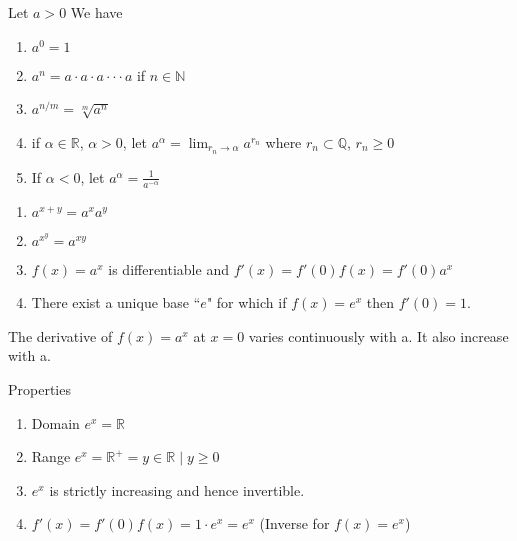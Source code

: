 

\begin{defn}[$a^x$]
Let $a > 0 $ We have
\begin{enumerate}
    \item $a^0 = 1$
    \item $a^n = a\cdot a\cdot a \cdot \cdot\cdot a$ if $n \in \mathbb{N}$
    \item $\displaystyle a^{n/m} = \sqrt[m]{a^{n}}$
    \item if $\alpha \in \mathbb{R}$, $\alpha > 0$, let $a^\alpha = \lim_{r_n\to \alpha}a^{r_n}$ where ${r_n}\subset \mathbb{Q}$, $r_n\geq 0$
    \item If $\alpha <0$, let $a^\alpha = \frac{1}{a^{-\alpha}}$
\end{enumerate}

\end{defn}

\begin{thm}[Properties of $a^x$]\leavevmode

\begin{enumerate}
    \item $a^{x+y} = a^xa^y$
    \item $a^{x^y} = a^{xy}$
    \item $f(x) =a^x$ is differentiable and $f'(x) = f'(0)f(x) = f'(0)a^x$
    \item There exist a unique base ``$e$" for which if $f(x) = e^x$ then $f'(0)= 1$.
\end{enumerate}
\begin{note}
    The derivative of $f(x) = a^x$ at $ x = 0$ varies continuously with a. It also increase with a.
\end{note}
\end{thm}

\begin{thm}
Properties
\begin{enumerate}
    \item Domain $e^x = \mathbb{R}$
    \item Range $e^x = \mathbb{R}^+ = {y \in \mathbb{R} \mid y \geq 0}$
    \item $e^x$ is strictly increasing and hence invertible.
    \item $f'(x) = f'(0)f(x) = 1\cdot e^x = e^x$ (Inverse for $f(x) = e^x$)
\end{enumerate}
\end{thm}

